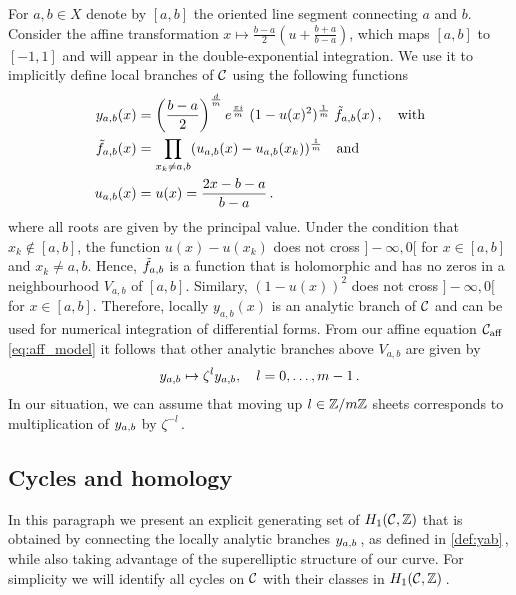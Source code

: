 \documentclass[main.tex]{subfiles}
\begin{document}
  
  For $a,b \in X$ denote by $[a,b]$ the oriented line segment connecting $a$ and $b$. Consider the affine transformation $x \mapsto \frac{b-a}{2}\left(u+\frac{b+a}{b-a}\right)$, which maps 
  $[a,b]$ to $[-1,1]$ and will appear in the double-exponential integration. \abstand
  We use it to implicitly  define local branches of $\mathcal{C}$ using the following functions
  \begin{align}\label{def:yab}
  \begin{split}
   y_{a,b}(x) & = \left(\frac{b-a}{2}\right)^{\frac{d}{m}} e^{\frac{\pi i}{m}} \; (1 - u(x)^2)^{\frac{1}{m}} \; \tilde{f}_{a,b}(x)\,, \quad \text{with} \\
   \tilde{f}_{a,b}(x) & = \prod_{x_k \ne a,b} (u_{a,b}(x) - u_{a,b}(x_k))^{\frac{1}{m}} \quad \text{and} \\
   u_{a,b}(x) & = u(x) = \frac{2x-b-a}{b-a}\,.
   \end{split}
  \end{align}
  where all roots are given by the principal value. Under the condition that $x_k \not\in [a,b]$, the function $u(x)-u(x_k)$ does not cross $]\!\!-\infty,0[$
  for $x \in [a,b]$ and $x_k \ne a,b$. Hence,
  $\tilde{f}_{a,b}$ is a function that is holomorphic and has no zeros in a neighbourhood $V_{a,b}$ of $[a,b]$. \abstand 
  Similary, $(1-u(x))^2$ does not cross $]\!\!-\infty,0[$ for $x \in [a,b]$. Therefore, locally
 $y_{a,b}(x)$ is an analytic branch of $\mathcal{C}$ and can be used for numerical integration of differential forms.
  From our affine equation $\mathcal{C}_{\text{aff}}$ \eqref{eq:aff_model} it follows that other analytic branches above $V_{a,b}$ are given by
  \begin{align}
      y_{a,b} \mapsto \zeta^l y_{a,b}, \quad l = 0,\dots,m-1\,.
  \end{align}
  In our situation, we can assume that moving up $l \in \mathbb{Z}/m\mathbb{Z}$ sheets corresponds to multiplication of $y_{a,b}$ by $\zeta^{-l}$\,. 

  \bigskip
  
  
  \subsection{Cycles and homology}\label{subsec:cycles_homo}
    
   In this paragraph we present an explicit generating set of $H_1(\mathcal{C},\mathbb{Z})$ that is obtained by connecting the locally analytic branches $y_{a,b}$\,, as defined in \eqref{def:yab}\,,
   while also taking advantage of the superelliptic structure of our curve.
   For simplicity we will identify all cycles on $\mathcal{C}$ with their classes in $H_1(\mathcal{C},\mathbb{Z})$\,.
   
\end{document}
